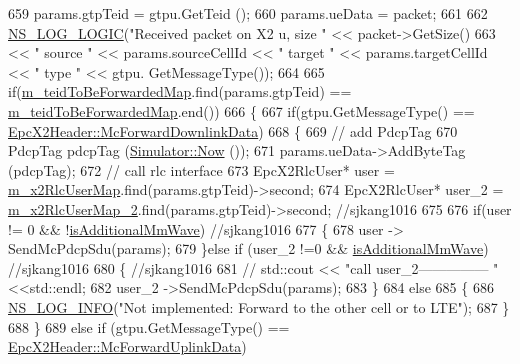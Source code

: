 \begin{DoxyCode}
659   params.gtpTeid = gtpu.GetTeid ();
660   params.ueData = packet;
661 
662   \hyperlink{group__logging_ga88acd260151caf2db9c0fc84997f45ce}{NS\_LOG\_LOGIC}(\textcolor{stringliteral}{"Received packet on X2 u, size "} << packet->GetSize() 
663     << \textcolor{stringliteral}{" source "} << params.sourceCellId << \textcolor{stringliteral}{" target "} << params.targetCellId << \textcolor{stringliteral}{" type "} << gtpu.
      GetMessageType());
664 
665   \textcolor{keywordflow}{if}(\hyperlink{classns3_1_1EpcX2_a18b54cbbfdd1a869ce3c504274294ab6}{m\_teidToBeForwardedMap}.find(params.gtpTeid) == 
      \hyperlink{classns3_1_1EpcX2_a18b54cbbfdd1a869ce3c504274294ab6}{m\_teidToBeForwardedMap}.end())
666   \{
667     \textcolor{keywordflow}{if}(gtpu.GetMessageType() == \hyperlink{classns3_1_1EpcX2Header_a0e69b043a20eaee4c570f223f4eca715a8a0607f112abe862244717f789ea9ba8}{EpcX2Header::McForwardDownlinkData})
668     \{
669       \textcolor{comment}{// add PdcpTag}
670       PdcpTag pdcpTag (\hyperlink{classns3_1_1Simulator_ac3178fa975b419f7875e7105be122800}{Simulator::Now} ());
671       params.ueData->AddByteTag (pdcpTag);
672       \textcolor{comment}{// call rlc interface}
673       EpcX2RlcUser* user = \hyperlink{classns3_1_1EpcX2_a1fca08301d8d13f29a81d66250e34746}{m\_x2RlcUserMap}.find(params.gtpTeid)->second;
674       EpcX2RlcUser* user\_2 = \hyperlink{classns3_1_1EpcX2_a71669e6a9be4d7640d05d8ff9fc21e62}{m\_x2RlcUserMap\_2}.find(params.gtpTeid)->second; \textcolor{comment}{//sjkang1016}
675 
676       \textcolor{keywordflow}{if}(user != 0 && !\hyperlink{classns3_1_1EpcX2_a3cc979cc2ca388967ddb4ca05f2d601d}{isAdditionalMmWave}) \textcolor{comment}{//sjkang1016}
677       \{
678         user -> SendMcPdcpSdu(params);
679       \}\textcolor{keywordflow}{else} \textcolor{keywordflow}{if} (user\_2 !=0 && \hyperlink{classns3_1_1EpcX2_a3cc979cc2ca388967ddb4ca05f2d601d}{isAdditionalMmWave}) \textcolor{comment}{//sjkang1016}
680       \{ \textcolor{comment}{//sjkang1016}
681         \textcolor{comment}{//  std::cout << "call user\_2--------------- " <<std::endl;}
682           user\_2 ->SendMcPdcpSdu(params);
683       \}
684       \textcolor{keywordflow}{else}
685       \{
686         \hyperlink{group__logging_gafbd73ee2cf9f26b319f49086d8e860fb}{NS\_LOG\_INFO}(\textcolor{stringliteral}{"Not implemented: Forward to the other cell or to LTE"});
687       \}
688     \} 
689     \textcolor{keywordflow}{else} \textcolor{keywordflow}{if} (gtpu.GetMessageType() == \hyperlink{classns3_1_1EpcX2Header_a0e69b043a20eaee4c570f223f4eca715a57a81c6c7add0af11a6230b460268ce6}{EpcX2Header::McForwardUplinkData})

\end{DoxyCode}
